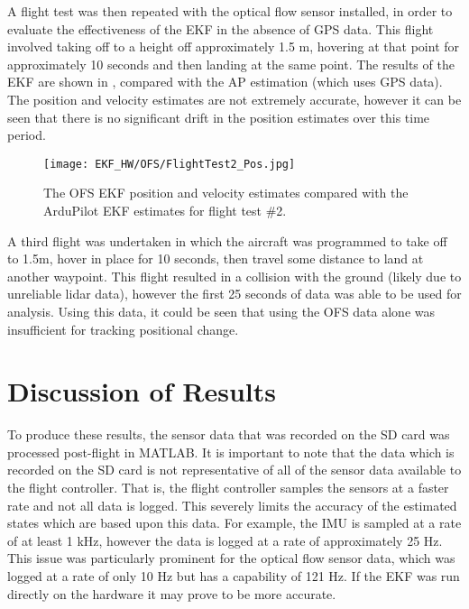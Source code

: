 A flight test was then repeated with the optical flow sensor installed, in order to evaluate the effectiveness of the EKF in the absence of GPS data. This flight involved taking off to a height off approximately 1.5 m, hovering at that point for approximately 10 seconds and then landing at the same point. The results of the EKF are shown in , compared with the AP estimation (which uses GPS data). The position and velocity estimates are not extremely accurate, however it can be seen that there is no significant drift in the position estimates over this time period.

\begin{figure}[htb]
	\texttt{[image: EKF\_HW/OFS/FlightTest2\_Pos.jpg]}%
	\caption{The OFS EKF position and velocity estimates compared with the ArduPilot EKF estimates for flight test \#2.}%
	\label{fig:HW_OFS_Pos}%
\end{figure}

A third flight was undertaken in which the aircraft was programmed to take off to 1.5m, hover in place for 10 seconds, then travel some distance to land at another waypoint. This flight resulted in a collision with the ground (likely due to unreliable lidar data), however the first 25 seconds of data was able to be used for analysis. Using this data, it could be seen that using the OFS data alone was insufficient for tracking positional change. 

\FloatBarrier
\section{Discussion of Results}
To produce these results, the sensor data that was recorded on the SD card was processed post-flight in MATLAB. It is important to note that the data which is recorded on the SD card is not representative of all of the sensor data available to the flight controller. That is, the flight controller samples the sensors at a faster rate and not all data is logged. This severely limits the accuracy of the estimated states which are based upon this data. For example, the IMU is sampled at a rate of at least 1 kHz, however the data is logged at a rate of approximately 25 Hz. This issue was particularly prominent for the optical flow sensor data, which was logged at a rate of only 10 Hz but has a capability of 121 Hz. If the EKF was run directly on the hardware it may prove to be more accurate. \\

